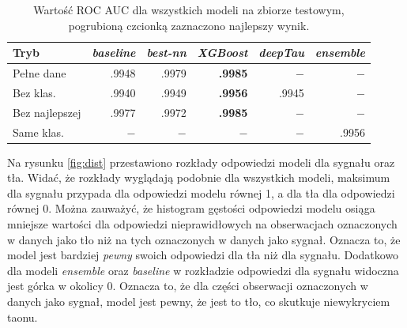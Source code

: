 \documentclass{pracalicmgr}
\begin{document}
	
	\begin{table}[H]
	\centering
	\caption{Wartość ROC AUC dla wszystkich modeli na zbiorze testowym, pogrubioną czcionką zaznaczono najlepszy wynik.}
	\label{tab:wyniki}
	\begin{tabular}{lrrrrr}
	\toprule
	Tryb & \textit{baseline} & \textit{best-nn} & \textit{XGBoost} & \textit{deepTau} & \textit{ensemble} \\
	\midrule
	Pełne dane & .9948 & .9979 & \textbf{.9985} & $-$ & $-$ \\
	Bez klas. & .9940 & .9949 & \textbf{.9956} & .9945 & $-$  \\
	Bez najlepszej & .9977 & .9972 & \textbf{.9985} & $-$ & $-$ \\
	Same klas. & $-$ & $-$ & $-$ & $-$ & .9956 \\
	\bottomrule
	\end{tabular}
	\end{table}
	
	Na rysunku \ref{fig:dist} przestawiono rozkłady odpowiedzi modeli dla sygnału oraz tła. Widać, że rozkłady wyglądają podobnie dla wszystkich modeli, maksimum dla sygnału przypada dla odpowiedzi modelu równej 1, a dla tła dla odpowiedzi równej 0. Można zauważyć, że histogram gęstości odpowiedzi modelu osiąga mniejsze wartości dla odpowiedzi nieprawidłowych na obserwacjach oznaczonych w danych jako tło niż na tych oznaczonych w danych jako sygnał. Oznacza to, że model jest bardziej \textit{pewny} swoich odpowiedzi dla tła niż dla sygnału. Dodatkowo dla modeli \textit{ensemble} oraz \textit{baseline} w rozkładzie odpowiedzi dla sygnału widoczna jest górka w okolicy 0. Oznacza to, że dla części obserwacji oznaczonych w danych jako sygnał, model jest pewny, że jest to tło, co skutkuje niewykryciem taonu.
\end{document}
